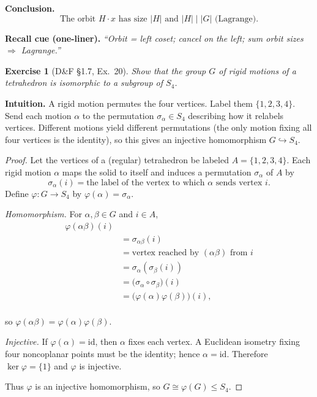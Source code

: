 \documentclass[12pt]{article}
\newtheorem{exercise}[theorem]{Exercise}
\theoremstyle{definition}
\begin{document}
\medskip
\noindent\textbf{Conclusion.}
\[
\boxed{\ \text{The orbit }H\cdot x \text{ has size }|H|\text{ and }|H|\mid|G|\text{ (Lagrange).}\ }
\]

\medskip
\noindent\textbf{Recall cue (one-liner).} \emph{“Orbit = left coset; cancel on the left; sum orbit sizes $\Rightarrow$ Lagrange.”}

\newpage

\begin{exercise}[D\&F §1.7, Ex.~20]
Show that the group $G$ of rigid motions of a tetrahedron is isomorphic to a subgroup of $S_4$.
\end{exercise}

\dotfill

\noindent\textbf{Intuition.}
A rigid motion permutes the four vertices. Label them $\{1,2,3,4\}$.
Send each motion $\alpha$ to the permutation $\sigma_\alpha\in S_4$ describing how it relabels vertices.
Different motions yield different permutations (the only motion fixing all four vertices is the identity), so this gives an injective homomorphism $G\hookrightarrow S_4$.

\dotfill

\begin{proof}
Let the vertices of a (regular) tetrahedron be labeled $A=\{1,2,3,4\}$.
Each rigid motion $\alpha$ maps the solid to itself and induces a permutation $\sigma_\alpha$ of $A$ by
\[
\sigma_\alpha(i)=\text{the label of the vertex to which }\alpha\text{ sends vertex }i.
\]
Define $\varphi:G\to S_4$ by $\varphi(\alpha)=\sigma_\alpha$.

\smallskip
\noindent\emph{Homomorphism.} For $\alpha,\beta\in G$ and $i\in A$,
\[
    \begin{aligned}
        \varphi(\alpha\beta)(i)\\
         &=\sigma_{\alpha\beta}(i)\\
         &= \text{vertex reached by }(\alpha\beta)\text{ from }i\\
         &= \sigma_\alpha(\sigma_\beta(i))\\
         &= \bigl(\sigma_\alpha\circ\sigma_\beta\bigr)(i)\\
         &= \bigl(\varphi(\alpha)\varphi(\beta)\bigr)(i),\\
    \end{aligned}
\]

so $\varphi(\alpha\beta)=\varphi(\alpha)\varphi(\beta)$.

\smallskip
\noindent\emph{Injective.} If $\varphi(\alpha)=\mathrm{id}$, then $\alpha$ fixes each vertex.
A Euclidean isometry fixing four noncoplanar points must be the identity; hence $\alpha=\mathrm{id}$.
Therefore $\ker\varphi=\{1\}$ and $\varphi$ is injective.

Thus $\varphi$ is an injective homomorphism, so $G\cong\varphi(G)\le S_4$.
\end{proof}
\end{document}

